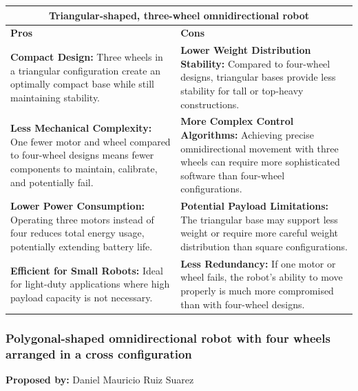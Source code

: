 \begin{table}[H]
\centering
\begin{tabular}{|p{}|p{}|}
\hline
\multicolumn{2}{|c|}{\textbf{Triangular-shaped, three-wheel omnidirectional robot}} \\
\hline
\textbf{Pros} & \textbf{Cons} \\
\hline
\textbf{Compact Design:} Three wheels in a triangular configuration create an optimally compact base while still maintaining stability. & \textbf{Lower Weight Distribution Stability:} Compared to four-wheel designs, triangular bases provide less stability for tall or top-heavy constructions. \\
\hline
\textbf{Less Mechanical Complexity:} One fewer motor and wheel compared to four-wheel designs means fewer components to maintain, calibrate, and potentially fail. & \textbf{More Complex Control Algorithms:} Achieving precise omnidirectional movement with three wheels can require more sophisticated software than four-wheel configurations. \\
\hline
\textbf{Lower Power Consumption:} Operating three motors instead of four reduces total energy usage, potentially extending battery life. & \textbf{Potential Payload Limitations:} The triangular base may support less weight or require more careful weight distribution than square configurations. \\
\hline
\textbf{Efficient for Small Robots:} Ideal for light-duty applications where high payload capacity is not necessary. & \textbf{Less Redundancy:} If one motor or wheel fails, the robot's ability to move properly is much more compromised than with four-wheel designs. \\
\hline
\end{tabular}
\end{table}

\subsubsection{Polygonal-shaped omnidirectional robot with four wheels arranged in a cross configuration}

\textbf{Proposed by:} Daniel Mauricio Ruiz Suarez

